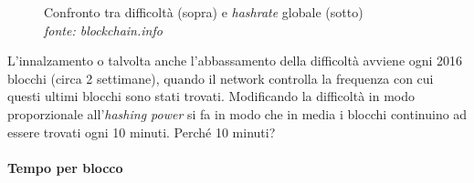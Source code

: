 \documentclass {article}
\begin{document}
\vspace {0.5cm}
\begin{figure}[htb!]
\captionsetup{width=1.4\linewidth}
\caption {Confronto tra difficoltà (sopra) e \textit{hashrate} globale (sotto)\\\textit{fonte: blockchain.info}}
\end{figure}
\vspace {0.2cm}
\noindent
%
L'innalzamento o talvolta anche l'abbassamento della difficoltà avviene ogni 2016 blocchi (circa 2 settimane), quando il network controlla la frequenza con cui questi ultimi blocchi sono stati trovati.
Modificando la difficoltà in modo proporzionale all'\textit{hashing power} si fa in modo che in media i blocchi continuino ad essere trovati ogni 10 minuti. Perché 10 minuti?

\paragraph {Tempo per blocco}
\end{document}
